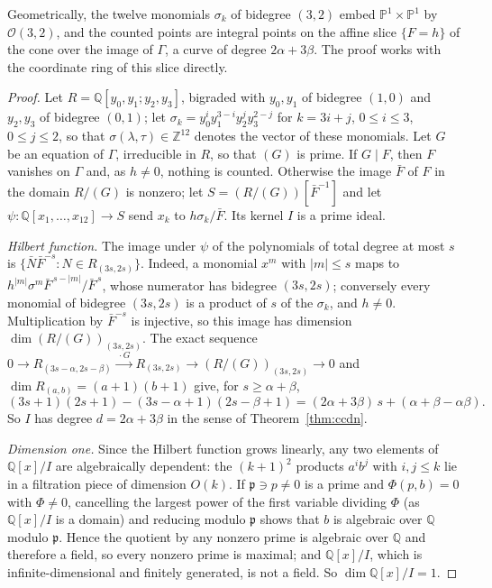 \documentclass[11pt,reqno]{amsart}
\theoremstyle{definition}
\theoremstyle{remark}
\numberwithin{equation}{section}
\newcommand{\Z}{\mathbb Z}
\newcommand{\Q}{\mathbb Q}
\newcommand{\PP}{\mathbb P}
\begin{document}
Geometrically, the twelve monomials $\sigma_k$ of bidegree $(3,2)$ embed
$\PP^1\times\PP^1$ by $\mathcal O(3,2)$, and the counted points are integral
points on the affine slice $\{F=h\}$ of the cone over the image of $\Gamma$,
a curve of degree $2\alpha+3\beta$. The proof works with the coordinate ring
of this slice directly.

\begin{proof}
Let $R=\Q[y_0,y_1;y_2,y_3]$, bigraded with $y_0,y_1$ of bidegree $(1,0)$ and
$y_2,y_3$ of bidegree $(0,1)$; let $\sigma_k=y_0^iy_1^{3-i}y_2^jy_3^{2-j}$ for
$k=3i+j$, $0\le i\le3$, $0\le j\le2$, so that $\sigma(\lambda,\tau)\in\Z^{12}$
denotes the vector of these monomials. Let $G$ be an equation of $\Gamma$,
irreducible in $R$, so that $(G)$ is prime. If $G\mid F$, then $F$ vanishes
on $\Gamma$ and, as $h\ne0$, nothing is counted. Otherwise the image $\bar F$
of $F$ in the domain $R/(G)$ is nonzero; let $S=(R/(G))[\bar F^{-1}]$ and
let $\psi\colon\Q[x_1,\dots,x_{12}]\to S$ send $x_k$ to $h\sigma_k/\bar F$.
Its kernel $I$ is a prime ideal.

\emph{Hilbert function.} The image under $\psi$ of the polynomials of total
degree at most $s$ is $\{\bar N\bar F^{-s}:N\in R_{(3s,2s)}\}$. Indeed, a
monomial $x^m$ with $|m|\le s$ maps to
$h^{|m|}\sigma^m\bar F^{\,s-|m|}/\bar F^{\,s}$, whose numerator has bidegree
$(3s,2s)$; conversely every monomial of bidegree $(3s,2s)$ is a product of
$s$ of the $\sigma_k$, and $h\ne0$. Multiplication by $\bar F^{-s}$ is
injective, so this image has dimension $\dim(R/(G))_{(3s,2s)}$. The exact
sequence
$0\to R_{(3s-\alpha,2s-\beta)}\xrightarrow{\ \cdot G\ }R_{(3s,2s)}\to(R/(G))_{(3s,2s)}\to0$
and $\dim R_{(a,b)}=(a+1)(b+1)$ give, for $s\ge\alpha+\beta$,
\[
(3s+1)(2s+1)-(3s-\alpha+1)(2s-\beta+1)=(2\alpha+3\beta)\,s+(\alpha+\beta-\alpha\beta).
\]
So $I$ has degree $d=2\alpha+3\beta$ in the sense of Theorem~\ref{thm:ccdn}.

\emph{Dimension one.} Since the Hilbert function grows linearly, any two
elements of $\Q[x]/I$ are algebraically dependent: the $(k+1)^2$ products
$a^ib^j$ with $i,j\le k$ lie in a filtration piece of dimension $O(k)$. If
$\mathfrak p\ni p\ne0$ is a prime and $\Phi(p,b)=0$ with $\Phi\ne0$, cancelling
the largest power of the first variable dividing $\Phi$ (as $\Q[x]/I$ is a
domain) and reducing modulo $\mathfrak p$ shows that $b$ is algebraic over
$\Q$ modulo $\mathfrak p$. Hence the quotient by any nonzero prime is algebraic
over $\Q$ and therefore a field, so every nonzero prime is maximal; and $\Q[x]/I$, which is
infinite-dimensional and finitely generated, is not a field. So
$\dim\Q[x]/I=1$.


\end{proof}
\end{document}

